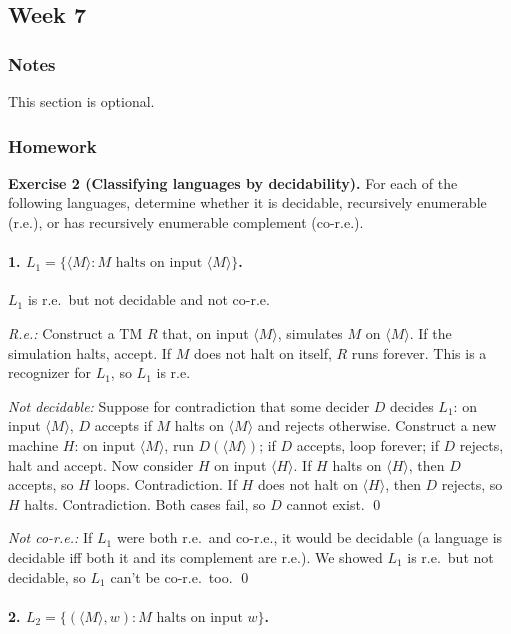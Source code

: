 \documentclass{article}
\theoremstyle{theorem}
\theoremstyle{definition}
\theoremstyle{remark}
\begin{document}
\subsection{Week 7}

\subsubsection{Notes}

This section is optional. 

\subsubsection{Homework}

\textbf{Exercise 2 (Classifying languages by decidability).}
For each of the following languages, determine whether it is decidable, recursively enumerable (r.e.), or has recursively enumerable complement (co-r.e.).

\paragraph{1. $L_1 = \{\langle M \rangle : M \text{ halts on input } \langle M \rangle\}$.}

$L_1$ is r.e.\ but not decidable and not co-r.e.

\emph{R.e.:} Construct a TM $R$ that, on input $\langle M \rangle$, simulates $M$ on $\langle M \rangle$. If the simulation halts, accept. If $M$ does not halt on itself, $R$ runs forever. This is a recognizer for $L_1$, so $L_1$ is r.e.

\emph{Not decidable:} Suppose for contradiction that some decider $D$ decides $L_1$: on input $\langle M \rangle$, $D$ accepts if $M$ halts on $\langle M \rangle$ and rejects otherwise. Construct a new machine $H$: on input $\langle M \rangle$, run $D(\langle M \rangle)$; if $D$ accepts, loop forever; if $D$ rejects, halt and accept. Now consider $H$ on input $\langle H \rangle$. If $H$ halts on $\langle H \rangle$, then $D$ accepts, so $H$ loops. Contradiction. If $H$ does not halt on $\langle H \rangle$, then $D$ rejects, so $H$ halts. Contradiction. Both cases fail, so $D$ cannot exist. \qed

\emph{Not co-r.e.:} If $L_1$ were both r.e.\ and co-r.e., it would be decidable (a language is decidable iff both it and its complement are r.e.). We showed $L_1$ is r.e.\ but not decidable, so $L_1$ can't be co-r.e.\ too. \qed

\paragraph{2. $L_2 = \{(\langle M \rangle, w) : M \text{ halts on input } w\}$.}
\end{document}
